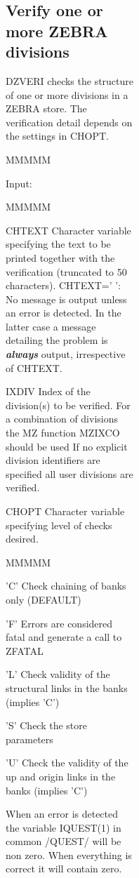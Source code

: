 \begin{figure}
\begin{figure}
\begin{figure}
\begin{figure}
\subsection{Verify one or more ZEBRA divisions}
\par DZVERI checks the structure of one or more divisions in a ZEBRA store.
The verification detail depends on the settings in CHOPT.
\begin{DL}{MMMMM}
\item[Input:
]
\begin{DL}{MMMMM}
\item[CHTEXT
]Character variable specifying the text to be printed
together with the verification (truncated to 50 characters).
\newline CHTEXT='  ': No message is output unless an error is detected.
In the latter case a message detailing the problem is
{\bf\it always} output, irrespective of CHTEXT.
\item[IXDIV
]Index of the division(s) to be verified.
\newline For a combination of divisions the MZ function MZIXCO should
be used
\newline If no explicit division identifiers are specified
all user divisions are verified.
\item[CHOPT
]Character variable specifying level of checks desired.
\begin{DL}{MMMMM}
\item['C'
]Check chaining of banks only (DEFAULT)
\item['F'
]Errors are considered fatal and generate a call to ZFATAL
\item['L'
]Check validity of the structural links in the banks
(implies 'C')
\item['S'
]Check the store parameters
\item['U'
]Check the validity of the up and origin links in the banks
(implies 'C')
\end{DL}
\end{DL}
\end{DL}
\par
When an error is detected the variable IQUEST(1) in common /QUEST/
will be non zero. When everything is correct it will contain zero.

\end{figure}
\end{figure}
\end{figure}
\end{figure}
